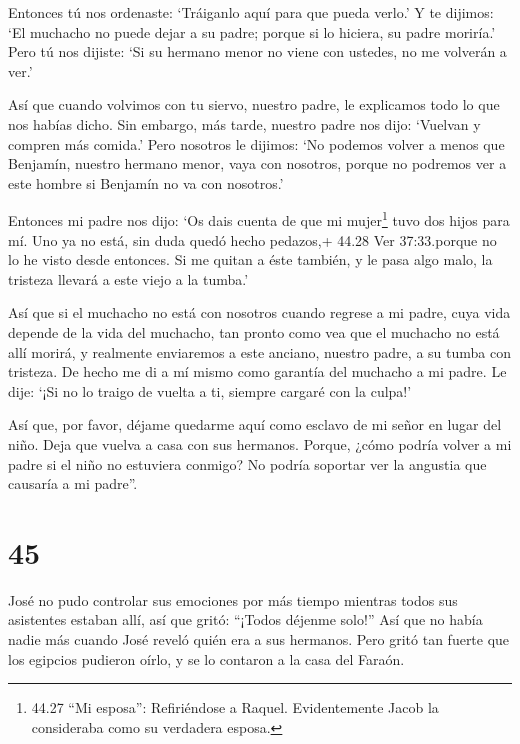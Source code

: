  Entonces tú nos ordenaste: `Tráiganlo aquí para que pueda
verlo.'  Y te dijimos: `El muchacho no puede dejar a su
padre; porque si lo hiciera, su padre moriría.'  Pero tú
nos dijiste: `Si su hermano menor no viene con ustedes, no me volverán a
ver.'

 Así que cuando volvimos con tu siervo, nuestro padre, le
explicamos todo lo que nos habías dicho.  Sin embargo, más
tarde, nuestro padre nos dijo: `Vuelvan y compren más comida.'
 Pero nosotros le dijimos: `No podemos volver a menos que
Benjamín, nuestro hermano menor, vaya con nosotros, porque no podremos
ver a este hombre si Benjamín no va con nosotros.'

 Entonces mi padre nos dijo: `Os dais cuenta de que mi
mujer\footnote{44.27 ``Mi esposa'': Refiriéndose a Raquel. Evidentemente
  Jacob la consideraba como su verdadera esposa.} tuvo dos hijos para
mí.  Uno ya no está, sin duda quedó hecho pedazos,+ 44.28
Ver 37:33.porque no lo he visto desde entonces.  Si me
quitan a éste también, y le pasa algo malo, la tristeza llevará a este
viejo a la tumba.'

 Así que si el muchacho no está con nosotros cuando regrese
a mi padre, cuya vida depende de la vida del muchacho,  tan
pronto como vea que el muchacho no está allí morirá, y realmente
enviaremos a este anciano, nuestro padre, a su tumba con tristeza.
 De hecho me di a mí mismo como garantía del muchacho a mi
padre. Le dije: `¡Si no lo traigo de vuelta a ti, siempre cargaré con la
culpa!'

 Así que, por favor, déjame quedarme aquí como esclavo de
mi señor en lugar del niño. Deja que vuelva a casa con sus hermanos.
 Porque, ¿cómo podría volver a mi padre si el niño no
estuviera conmigo? No podría soportar ver la angustia que causaría a mi
padre''.

\hypertarget{section-44}{%
\section{45}\label{section-44}}

 José no pudo controlar sus emociones por más tiempo
mientras todos sus asistentes estaban allí, así que gritó: ``¡Todos
déjenme solo!'' Así que no había nadie más cuando José reveló quién era
a sus hermanos.  Pero gritó tan fuerte que los egipcios
pudieron oírlo, y se lo contaron a la casa del Faraón.

